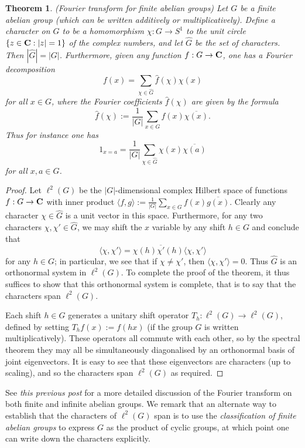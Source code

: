 \documentclass[10pt,reqno]{amsart}
\newtheorem{theorem}{Theorem}
\begin{document}
\begin{theorem}
    (Fourier transform for finite abelian groups) Let $G$ be a finite abelian group (which can be written additively or multiplicatively). Define a \emph{character} on $G$ to be a homomorphism $\chi: G \rightarrow S^1$ to the unit circle $\{ z \in {\bf C}: |z|=1\}$ of the complex numbers, and let $\hat G$ be the set of characters. Then $|\hat G| = |G|$. Furthermore, given any function $f: G \rightarrow {\bf C}$, one has a Fourier decomposition
    \[  f(x) = \sum_{\chi \in \hat G} \hat f(\chi) \chi(x)\]
    for all $x \in G$, where the Fourier coefficients $\hat f(\chi)$ are given by the formula
    \[  \hat f(\chi) := \frac{1}{|G|} \sum_{x \in G} f(x) \overline{\chi(x)}.\]
    Thus for instance one has
    \begin{equation}   1_{x=a} = \frac{1}{|G|} \sum_{\chi \in \hat G} \chi(x) \overline{\chi(a)} \end{equation}
    for all $x,a \in G$.
\end{theorem}
\begin{proof}
    Let $\ell^2(G)$ be the $|G|$-dimensional complex Hilbert space of functions $f: G \rightarrow {\bf C}$ with inner product $\langle f, g \rangle := \frac{1}{|G|} \sum_{x \in G} f(x) \overline{g(x)}$. Clearly any character $\chi \in \hat G$ is a unit vector in this space. Furthermore, for any two characters $\chi,\chi' \in \hat G$, we may shift the $x$ variable by any shift $h \in G$ and conclude that
    \[  \langle \chi, \chi' \rangle = \chi(h) \overline{\chi'}(h) \langle \chi, \chi' \rangle\]
    for any $h \in G$; in particular, we see that if $\chi \neq \chi'$, then $\langle \chi,\chi' \rangle =0$. Thus $\hat G$ is an orthonormal system in $\ell^2(G)$. To complete the proof of the theorem, it thus suffices to show that this orthonormal system is complete, that is to say that the characters span $\ell^2(G)$.

    Each shift $h \in G$ generates a unitary shift operator $T_h: \ell^2(G) \rightarrow \ell^2(G)$, defined by setting $T_h f(x) := f(hx)$ (if the group $G$ is written multiplicatively). These operators all commute with each other, so by the spectral theorem they may all be simultaneously diagonalised by an orthonormal basis of joint eigenvectors. It is easy to see that these eigenvectors are characters (up to scaling), and so the characters span $\ell^2(G)$ as required. %
\end{proof}

See \emph{this previous post} for a more detailed discussion of the Fourier transform on both finite and infinite abelian groups. We remark that an alternate way to establish that the characters of $\ell^2(G)$ span is to use the \emph{classification of finite abelian groups} to express $G$ as the product of cyclic groups, at which point one can write down the characters explicitly.
\end{document}

